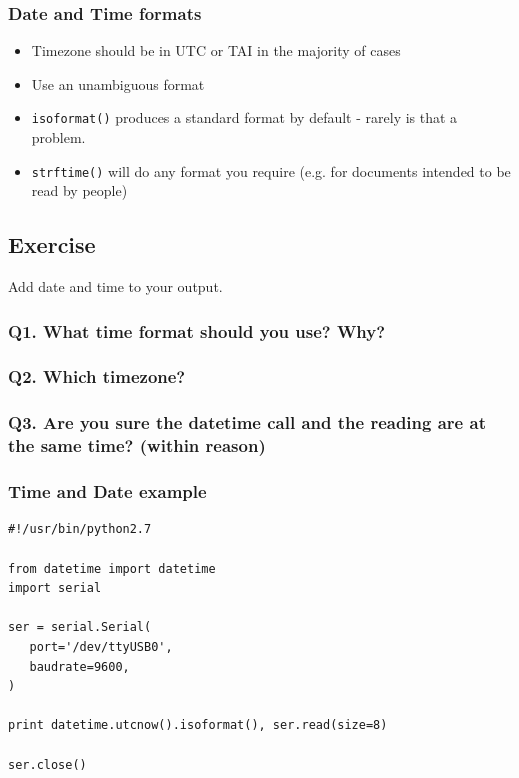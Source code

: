 \documentclass[aspectratio=1610,9pt]{beamer} %
\begin{document}
\begin{frame}[fragile]
\frametitle{Date and Time formats}

\begin{itemize}
\itemsep1pt\parskip0pt
\item
  Timezone should be in UTC or TAI in the majority of cases
\item
  Use an unambiguous format
\item
  \texttt{isoformat()} produces a standard format by default - rarely is
  that a problem.
\item
  \texttt{strftime()} will do any format you require (e.g. for documents
  intended to be read by people)
\end{itemize}


\subsection{Exercise}

Add date and time to your output.

\subsubsection{Q1. What time format should you use?
Why?}

\subsubsection{Q2. Which timezone?}

\subsubsection{Q3. Are you sure the datetime call and the reading are at
the same time? (within
reason)}

\end{frame}
\begin{frame}[fragile]
\frametitle{Time and Date example}

\begin{verbatim}
#!/usr/bin/python2.7

from datetime import datetime
import serial

ser = serial.Serial(
   port='/dev/ttyUSB0',
   baudrate=9600,
)

print datetime.utcnow().isoformat(), ser.read(size=8) 

ser.close()
\end{verbatim}
\end{frame}
\end{document}
